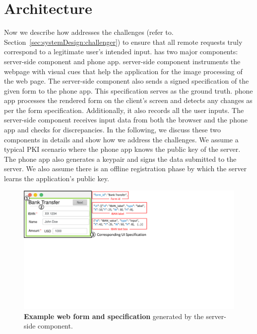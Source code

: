 \section{\sysname Architecture} \label{sec:hardenUI}

 Now we describe how \sysname addresses the challenges (refer to. Section~\ref{sec:systemDesign:challenger}) to ensure that all remote requests truly correspond to a legitimate user's intended input. \sysname has two major components: \name server-side component and \name phone app. \name server-side component instruments the webpage with visual cues that help the \name application for the image processing of the web page. The server-side component also sends a signed specification of the given form to the phone app. This specification serves as the ground truth. \name phone app processes the rendered form on the client's screen and detects any changes as per the form specification. Additionally, it also records all the user inputs. The \name server-side component receives input data from both the browser and the phone app and checks for discrepancies. In the following, we discuss these two components in details and show how we address the challenges. We assume a typical PKI scenario where the phone app knows the public key of the server. The phone app also generates a keypair and signs the data submitted to the server. We also assume there is an offline registration phase by which the server learns the \sysname application's public key.

\begin{figure}[t]
	\centering
\includegraphics[trim={0 11.5cm 14cm 0},clip, width=0.8\linewidth]{chapters/IntegriScreen/newImg/runningExample.pdf} 
	\caption[Example web form and specification generated by the \name server-side component]{\textbf{Example web form and specification} generated by the \name server-side component.}
	\label{fig:runningExample}
\end{figure}



